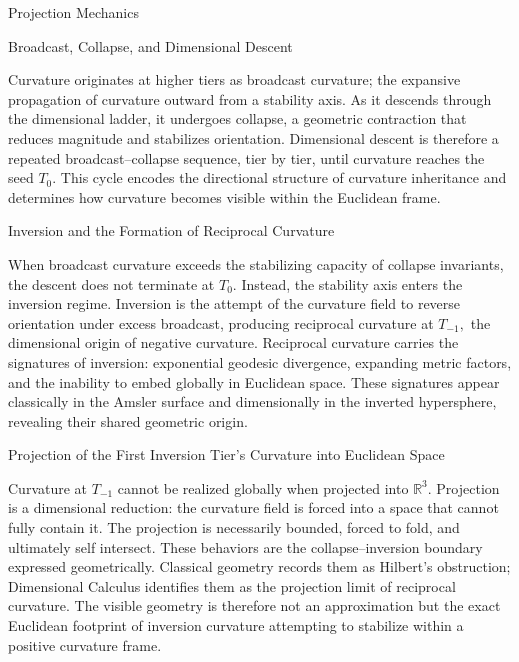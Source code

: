 \documentclass[final,onefignum,onetabnum]{siamart}
\begin{document}
\begin{section}{Projection Mechanics}
\begin{subsection}{Broadcast, Collapse, and Dimensional Descent}

Curvature originates at higher tiers as broadcast curvature; the expansive propagation of curvature outward from a stability axis. As it descends through the dimensional ladder, it undergoes collapse, a geometric contraction that reduces magnitude and stabilizes orientation. Dimensional descent is therefore a repeated broadcast–collapse sequence, tier by tier, until curvature reaches the seed $T_0.$ This cycle encodes the directional structure of curvature inheritance and determines how curvature becomes visible within the Euclidean frame.
\end{subsection}

\begin{subsection}{Inversion and the Formation of Reciprocal Curvature}

When broadcast curvature exceeds the stabilizing capacity of collapse invariants, the descent does not terminate at $T_0.$ Instead, the stability axis enters the inversion regime. Inversion is the attempt of the curvature field to reverse orientation under excess broadcast, producing reciprocal curvature at $T_{-1},$ the dimensional origin of negative curvature. Reciprocal curvature carries the signatures of inversion: exponential geodesic divergence, expanding metric factors, and the inability to embed globally in Euclidean space. These signatures appear classically in the Amsler surface and dimensionally in the inverted hypersphere, revealing their shared geometric origin.
\end{subsection}

\begin{subsection}{Projection of the First Inversion Tier's Curvature into Euclidean Space}

Curvature at $T_{-1}$ cannot be realized globally when projected into $\mathbb{R}^3.$ Projection is a dimensional reduction: the curvature field is forced into a space that cannot fully contain it. The projection is necessarily bounded, forced to fold, and ultimately self intersect. These behaviors are the collapse–inversion boundary expressed geometrically. Classical geometry records them as Hilbert’s obstruction; Dimensional Calculus identifies them as the projection limit of reciprocal curvature. The visible geometry is therefore not an approximation but the exact Euclidean footprint of inversion curvature attempting to stabilize within a positive curvature frame.
\end{subsection}


\end{section}
\end{document}
